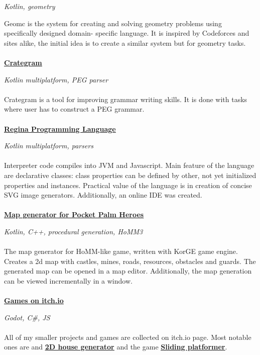 \documentclass{article}
\begin{document}
\noindent\textit{Kotlin, geometry}

\noindent Geomc is the system for creating and solving geometry problems using specifically designed domain-
specific language. It is inspired by Codeforces and sites alike, the initial idea is to create a similar system
but for geometry tasks.
\\\\
\noindent\href{https://llesha.github.io/CrateGram/}{{\textbf{\underline{Crategram}}}}

\noindent\textit{Kotlin multiplatform, PEG parser}
\\\\
\noindent Crategram is a tool for improving grammar writing skills. It is done with tasks where user has to construct
a PEG grammar.
\\\\
\noindent\href{https://llesha.github.io/regina/ide/}{{\textbf{\underline{Regina Programming Language}}}}

\noindent\textit{Kotlin multiplatform, parsers}
\\\\
\noindent Interpreter code compiles into JVM and Javascript. Main feature of the language are declarative classes: class properties can be defined by other, not yet initialized properties and instances. Practical value of the language is in creation of concise SVG image generators. Additionally, an online IDE was created.
\\\\
\noindent\href{https://github.com/llesha/MapGen-KorGE}{{\textbf{\underline{Map generator for Pocket Palm Heroes}}}}

\noindent\textit{Kotlin, C++, procedural generation, HoMM3}
 \\\\
\noindent The map generator for HoMM-like game, written with KorGE game engine. Creates a 2d map with castles, mines, roads, resources, obstacles and guards. The generated map can be opened in a map editor. Additionally, the map generation can be viewed incrementally in a window.
\\\\
\noindent\href{https://llesha.itch.io/}{{\textbf{\underline{Games on itch.io}}}}

\noindent\textit{Godot, C\#, JS}
\\\\
\noindent All of my smaller projects and games are collected on itch.io page. Most notable ones are
and \href{https://llesha.itch.io/2d-house-generator}{{\textbf{\underline{2D house generator}}}} and the game \href{https://llesha.itch.io/sliding-platformer}{{\textbf{\underline{Sliding platformer}}}}.
\end{document}

